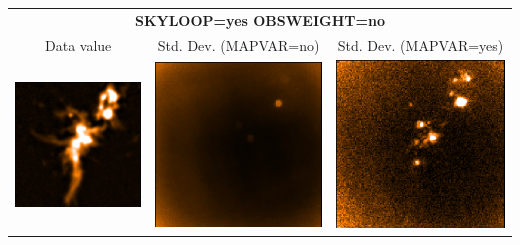 \vspace{5mm}
\begin{tabular}{|ccc|}
\hline
\multicolumn{3}{|c|}{\textbf{SKYLOOP=yes OBSWEIGHT=no}} \\
Data value & Std. Dev. (MAPVAR=no) & Std. Dev. (MAPVAR=yes) \\
\includegraphics[width=\picwid]{tailoring/i3.png} &
\includegraphics[width=\picwid]{tailoring/sqvar3.png} &
\includegraphics[width=\picwid]{tailoring/disp3.png} \\
\hline
\end{tabular}

